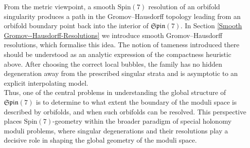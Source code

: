 \documentclass[psamsfonts]{amsart}
\theoremstyle{plain}
\theoremstyle{definition}{
\newtheorem{defi}{Definition}[section]
\newtheorem{ass}{Assumption}
\newtheorem*{nota}{Notation}}
\theoremstyle{remark}{
\newtheorem{rem}{Remark}
\newtheorem{ex}{Example}}
\theoremstyle{plain}{
\newtheorem{thm}{Theorem}[section]
\newtheorem{lem}{Lemma}[section]
\newtheorem{cor}{Corollary}[section]
\newtheorem{prop}{Proposition}[section]
\newtheorem{con}{Conjecture}[section]}
\newcommand{\m}[1]{{\mathrm{#1}}}
\newcommand{\cat}[1]{\textbf{#1}}
\begin{document}
From the metric viewpoint, a smooth $\m{Spin}(7)$ resolution of an orbifold singularity produces a path in the Gromov--Hausdorff topology leading from an orbifold boundary point back into the interior of $\mathfrak{Spin}(7)$. In Section \ref{Smooth Gromov--Hausdorff-Resolutions} we introduce smooth Gromov--Hausdorff resolutions, which formalise this idea. The notion of tameness introduced there should be understood as an analytic expression of the compactness heuristic above. After choosing the correct local bubbles, the family has no hidden degeneration away from the prescribed singular strata and is asymptotic to an explicit interpolating model.\\

Thus, one of the central problems in understanding the global structure of $\mathfrak{Spin}(7)$ is to determine to what extent the boundary of the moduli space is described by orbifolds, and when such orbifolds can be resolved. This perspective places $\m{Spin}(7)$-geometry within the broader paradigm of special holonomy moduli problems, where singular degenerations and their resolutions play a decisive role in shaping the global geometry of the moduli space.





 


\end{document}
